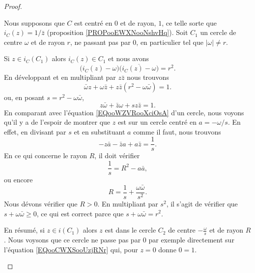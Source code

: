 \begin{proof}
\begin{enumerate}
		      \begin{subproof}
			      Nous supposons que \( C\) est centré en \( 0\) et de rayon, \( 1\), ce telle sorte que \( i_C(z)=1/ \bar z\) (proposition \ref{PROPooEWXNooNshvHq}). Soit \( C_1\) un cercle de centre \( \omega\) et de rayon \( r\), ne passant pas par \( 0\), en particulier tel que \( | \omega |\neq r\).

			      Si \( z\in i_C(C_1)\) alors \( i_C(z)\in C_1\) et nous avons
			      \begin{equation}
				      \big( i_C(z)-\omega \big)\overline{ \big( i_C(z)-\omega \big)}=r^2.
			      \end{equation}
			      En développant et en multipliant par \( z\bar z\) nous trouvons
			      \begin{equation}		\label{EQooCWXSooUzjRNr}
				      \bar \omega z+\omega\bar z+z\bar z(r^2-\omega\bar\omega)=1.
			      \end{equation}
			      ou, en posant \( s=r^2-\omega\bar \omega\),
			      \begin{equation}
				      z\bar\omega+\bar z\omega+sz\bar z=1.
			      \end{equation}
			      En comparant avec l'équation \eqref{EQooWZVRooXciOsA} d'un cercle, nous voyons qu'il y a de l'espoir de montrer que \( z\) est sur un cercle centré en \( a=-\omega/s\). En effet, en divisant par \( s\) et en substituant \( a\) comme il faut, nous trouvons
			      \begin{equation}
				      -z\bar a-\bar za+a\bar z=\frac{1}{ s}.
			      \end{equation}
			      En ce qui concerne le rayon \( R\), il doit vérifier
			      \begin{equation}
				      \frac{1}{ s}=R^2-a\bar a,
			      \end{equation}
			      ou encore
			      \begin{equation}
				      R=\frac{1}{ s}+\frac{ \omega\bar\omega }{ s^2 }.
			      \end{equation}
			      Nous dévons vérifier que \( R>0\). En multipliant par \( s^2\), il s'agit de vérifier que \( s+\omega\bar \omega\geq 0\), ce qui est correct parce que \( s+\omega\bar\omega=r^2\).

			      En résumé, si \( z\in i(C_1)\) alors \( z\) est dans le cercle \( C_2\) de centre \( -\frac{ \omega }{ s }\) et de rayon \( R\). Nous voysons que ce cercle ne passe pas par \( 0\) par exemple directement sur l'équation \eqref{EQooCWXSooUzjRNr} qui, pour \( z=0\) donne \( 0=1\).


\end{subproof}
\end{enumerate}
\end{proof}
